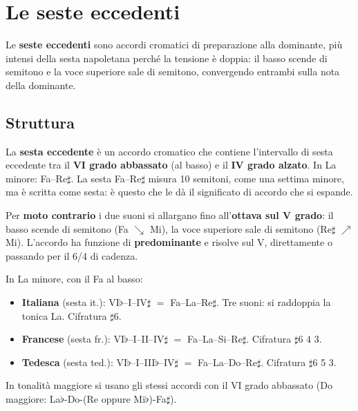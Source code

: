 \chapter{Le seste eccedenti}
\label{chap:seste_eccedenti}

Le \textbf{seste eccedenti} sono accordi cromatici di preparazione alla dominante, più intensi della sesta napoletana perché la tensione è doppia: il basso scende di semitono e la voce superiore sale di semitono, convergendo entrambi sulla nota della dominante.

\section{Struttura}
\label{sec:struttura_seste}

\begin{definizione}
	\label{def:sesta_eccedente_cap}
	La \textbf{sesta eccedente} è un accordo cromatico che contiene l'intervallo di sesta eccedente tra il \textbf{VI grado abbassato} (al basso) e il \textbf{IV grado alzato}. In La minore: Fa--Re$\sharp$. La sesta Fa--Re$\sharp$ misura 10 semitoni, come una settima minore, ma è scritta come sesta: è questo che le dà il significato di accordo che si espande.
\end{definizione}

Per \textbf{moto contrario} i due suoni si allargano fino all'\textbf{ottava sul V grado}: il basso scende di semitono (Fa $\searrow$ Mi), la voce superiore sale di semitono (Re$\sharp$ $\nearrow$ Mi). L'accordo ha funzione di \textbf{predominante} e risolve sul V, direttamente o passando per il 6/4 di cadenza.

\begin{definizione}
	\label{def:tre_seste}
	In La minore, con il Fa al basso:
	\begin{itemize}
		\item \textbf{Italiana} (sesta it.): VI$\flat$--I--IV$\sharp$ $=$ Fa--La--Re$\sharp$. Tre suoni: si raddoppia la tonica La. Cifratura $\sharp$6.
		\item \textbf{Francese} (sesta fr.): VI$\flat$--I--II--IV$\sharp$ $=$ Fa--La--Si--Re$\sharp$. Cifratura $\sharp$6 4 3.
		\item \textbf{Tedesca} (sesta ted.): VI$\flat$--I--III$\flat$--IV$\sharp$ $=$ Fa--La--Do--Re$\sharp$. Cifratura $\sharp$6 5 3.
	\end{itemize}
	In tonalità maggiore si usano gli stessi accordi con il VI grado abbassato (Do maggiore: La$\flat$-Do-(Re oppure Mi$\flat$)-Fa$\sharp$).
\end{definizione}

